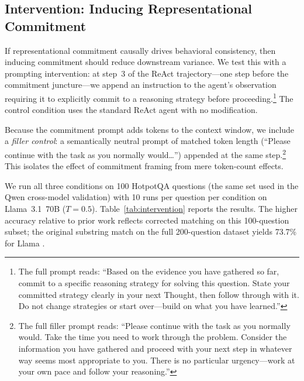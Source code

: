\documentclass{article}
\begin{document}
\subsection{Intervention: Inducing Representational Commitment}
\label{sec:intervention}

If representational commitment causally drives behavioral consistency, then inducing commitment should reduce downstream variance. We test this with a prompting intervention: at step~3 of the ReAct trajectory---one step before the commitment juncture---we append an instruction to the agent's observation requiring it to explicitly commit to a reasoning strategy before proceeding.\footnote{The full prompt reads: ``Based on the evidence you have gathered so far, commit to a specific reasoning strategy for solving this question. State your committed strategy clearly in your next Thought, then follow through with it. Do not change strategies or start over---build on what you have learned.''} The control condition uses the standard ReAct agent with no modification.

Because the commitment prompt adds tokens to the context window, we include a \emph{filler control}: a semantically neutral prompt of matched token length (``Please continue with the task as you normally would\ldots'') appended at the same step.\footnote{The full filler prompt reads: ``Please continue with the task as you normally would. Take the time you need to work through the problem. Consider the information you have gathered and proceed with your next step in whatever way seems most appropriate to you. There is no particular urgency---work at your own pace and follow your reasoning.''} This isolates the effect of commitment framing from mere token-count effects.

We run all three conditions on 100 HotpotQA questions (the same set used in the Qwen cross-model validation) with 10 runs per question per condition on Llama~3.1~70B ($T = 0.5$). Table~\ref{tab:intervention} reports the results. The higher accuracy relative to prior work reflects corrected matching on this 100-question subset; the original substring match on the full 200-question dataset yields 73.7\% for Llama \citep{anonymous2026a}.
\end{document}
